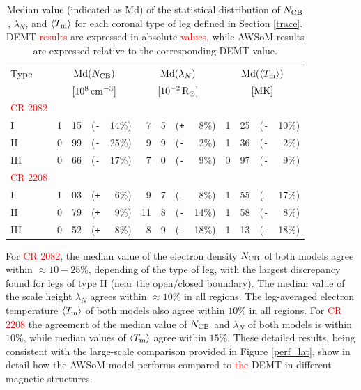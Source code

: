 \documentclass[namedreferences]{solarphysics}
\def\edit#1{\textcolor{Red}{#1}}
\newcommand{\mrsun}{{\rm R_\odot}}
\newcommand{\med}{{\rm Md}}
\newcommand{\avgTe}{\left<\Tm\right>}
\newcommand{\MK}{{\rm MK}}
\newcommand{\lN}{\lambda_N}
\newcommand{\NCB}{N_{\rm CB}}
\newcommand{\Tm}{T_{\rm m}}
\newcommand{\aTm}{\left<\Tm\right>}
\newcommand{\Pl}{\texttt{+}}
\newcommand{\Mi}{\texttt{-}}
\begin{document}
\begin{article}
\begin{table}
\begin{tabular}{l r@{.}l@{\hskip 0.05in} r@{\hskip 0.01in} r  r@{.}l@{\hskip 0.05in} r@{\hskip 0.01in} r r@{.}l@{\hskip 0.05in} r@{\hskip 0.01in} r }
\hline
Type    & \multicolumn{4}{c}{$\med(\NCB)$}             & \multicolumn{4}{c}{$\med(\lN)$} & \multicolumn{4}{c}{$\med(\avgTe)$} \\
        & \multicolumn{4}{c}{$[10^8\,{\rm cm}^{-3}]$}  & \multicolumn{4}{c}{$[{\rm 10}^{-2}\,\mrsun]$} & \multicolumn{4}{c}{$[\MK]$} \\
\hline
\edit{CR 2082}\\
I    & 1&15 &(\Mi&14\%)  &   7&5 &(\Pl&~8\%) &   1&25 &(\Mi&10\%) \\
II   & 0&99 &(\Mi&25\%)  &   9&9 &(\Mi&~2\%) &   1&36 &(\Mi&~2\%) \\
III  & 0&66 &(\Mi&17\%)  &   7&0 &(\Mi&~9\%) &   0&97 &(\Mi&~9\%) \\
\hline          
\edit{CR 2208}\\
I    & 1&03 &(\Pl&~6\%)  &   9&7 &(\Mi&~8\%) &   1&55 &(\Mi&17\%) \\
II   & 0&79 &(\Pl&~9\%)  &  11&8 &(\Mi&14\%) &   1&58 &(\Mi&~8\%) \\
III  & 0&{52} &({\Pl}&~{8}\%)  &   8&9 &(\Mi&18\%) &   1&{13} &(\Mi&18\%) \\
\hline   
\end{tabular}
\caption{Median value (indicated as Md) of the statistical distribution of $\NCB$, $\lN$, and $\aTm$ for each coronal type of leg defined in Section \ref{trace}. DEMT \edit{results} are expressed in absolute \edit{values}, while AWSoM results are expressed relative to the corresponding DEMT value.}
\label{tabla_comp}
\end{table}

{For \edit{CR 2082}, the median value of the electron density $\NCB$ of both models agree within $\approx 10-25\%$, {depending of the type of leg, with the largest discrepancy found for legs of type II (near the open/closed boundary). The} median value of the scale height $\lN$ agrees {within $\approx 10\%$ in all regions}. The leg-averaged electron temperature $\aTm$ of both models also agree {within $10\%$ in all regions}. For \edit{CR 2208} the agreement of the median value of $\NCB$ and $\lN$ of both models {is within $10\%$, while} median values of $\aTm$ agree within $15\%$. {These detailed results, being consistent with the large-scale comparison provided in Figure \ref{perf_lat}, show in detail how the AWSoM model performs compared to \edit{the} DEMT in different magnetic structures.}}


\end{article}
\end{document}
